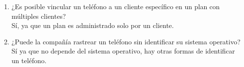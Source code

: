 \documentclass[a4paper, 12pt]{report}
\begin{document}
\begin{enumerate}
{\begin{enumerate}
{\begin{enumerate}
            Tiene cardinalidad uno a muchos con participación total de
            un lado y parcial del otro, es decir un cliente tiene muchos
            clientes pero un cliente solo tiene un cliente,
            además un cliente siempre tiene un cliente y a la vez un
            cliente puede no tener un cliente.
            \item ¿Es posible vincular un teléfono a un cliente
            específico en un plan con múltiples clientes?\\
            Sí, ya que un plan es administrado solo por un cliente.
            \item ¿Puede la compañía rastrear un teléfono sin identificar su
            sistema operativo?\\
            Sí ya que no depende del sistema operativo, hay otras
            formas de identificar un teléfono.

        \end{enumerate}
    }
\end{enumerate}
}
\end{enumerate}


\begin{thebibliography}{20}
\end{thebibliography}
\end{document}
